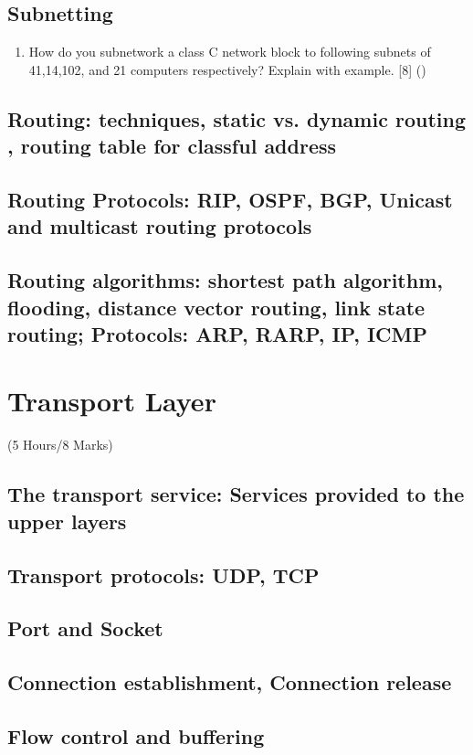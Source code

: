 \documentclass[12pt]{article}
\begin{document}
	\subsection{Subnetting}
		\begin{enumerate}[noitemsep, topsep=0pt]
			\item How do you subnetwork a class C network block to following subnets of 41,14,102, and 21 computers respectively? Explain with example. \hfill [8] ()
		\end{enumerate}

	\subsection{Routing: techniques, static vs. dynamic routing , routing table for classful address}
	\subsection{Routing Protocols: RIP, OSPF, BGP, Unicast and multicast routing protocols}
	\subsection{Routing algorithms: shortest path algorithm, flooding, distance vector routing, link state routing; Protocols: ARP, RARP, IP, ICMP}

	\pagebreak
\section{Transport Layer}
	\begin{center}(5 Hours/8 Marks)\end{center}
	\subsection{The transport service: Services provided to the upper layers}
	\subsection{Transport protocols: UDP, TCP}
	\subsection{Port and Socket}
	\subsection{Connection establishment, Connection release}
	\subsection{Flow control and buffering}
\end{document}
